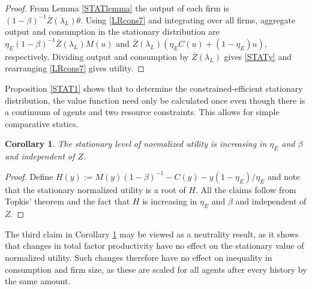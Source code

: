 \documentclass[11pt]{article}
\theoremstyle{plain}
\newtheorem{corl}[thm]{Corollary}
\begin{document}
\begin{proof}
From Lemma \ref{STATlemma} the output of each firm is $(1-\beta)^{-1}\overline{Z}(\lambda_L)\theta$. Using \eqref{LRcons7} and integrating over all firms, aggregate output and consumption in the stationary distribution are $\eta_E(1-\beta)^{-1}\overline{Z}(\lambda_L)M(u)$ and $\overline{Z}(\lambda_L){\left(\eta_EC(u) + (1-\eta_E)u\right)}$, respectively. Dividing output and consumption by $\overline{Z}(\lambda_L)$ gives \eqref{STATy} and rearranging \eqref{LRcons7} gives utility. 
\end{proof}
Proposition \ref{STAT1} shows that to determine the constrained-efficient stationary distribution, the value function need only be calculated once even though there is a continuum of agents and two resource constraints. This allows for simple comparative statics. 
\begin{corl} \label{compstat3}
The stationary level of normalized utility is increasing in $\eta_E$ and $\beta$ and independent of $Z$.
\end{corl}
\begin{proof}
Define $H(y) :=  M(y)(1-\beta)^{-1} - C(y) - y(1-\eta_E)/\eta_E$ and note that the stationary normalized utility is a root of $H$. All the claims follow from Topkis' theorem and the fact that $H$ is increasing in $\eta_E$ and $\beta$ and independent of $Z$. 
\end{proof}
The third claim in Corollary \ref{compstat3} may be viewed as a neutrality result, as it shows that changes in total factor productivity have no effect on the stationary value of normalized utility. Such changes therefore have no effect on inequality in consumption and firm size, as these are scaled for all agents after every history by the same amount. 
\end{document}
